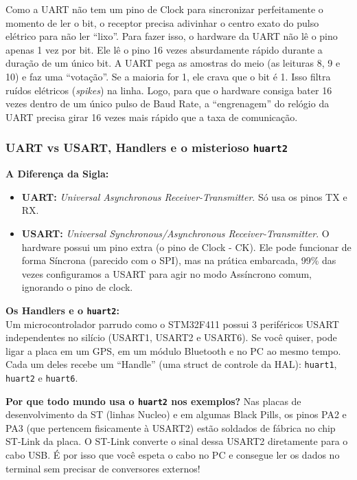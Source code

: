 \documentclass[12pt,a4paper]{article}
\begin{document}
Como a UART não tem um pino de Clock para sincronizar perfeitamente o momento de ler o bit, o receptor precisa adivinhar o centro exato do pulso elétrico para não ler ``lixo''.
Para fazer isso, o hardware da UART não lê o pino apenas 1 vez por bit. Ele lê o pino 16 vezes absurdamente rápido durante a duração de um único bit.
A UART pega as amostras do meio (as leituras 8, 9 e 10) e faz uma ``votação''. Se a maioria for 1, ele crava que o bit é 1. Isso filtra ruídos elétricos (\textit{spikes}) na linha.
Logo, para que o hardware consiga bater 16 vezes dentro de um único pulso de Baud Rate, a ``engrenagem'' do relógio da UART precisa girar 16 vezes mais rápido que a taxa de comunicação.

\subsubsection{UART vs USART, Handlers e o misterioso \texttt{huart2}}
\textbf{A Diferença da Sigla:}
\begin{itemize}
    \item \textbf{UART:} \textit{Universal Asynchronous Receiver-Transmitter}. Só usa os pinos TX e RX.
    \item \textbf{USART:} \textit{Universal Synchronous/Asynchronous Receiver-Transmitter}. O hardware possui um pino extra (o pino de Clock - CK). Ele pode funcionar de forma Síncrona (parecido com o SPI), mas na prática embarcada, 99\% das vezes configuramos a USART para agir no modo Assíncrono comum, ignorando o pino de clock.
\end{itemize}

\textbf{Os Handlers e o \texttt{huart2}:}\\
Um microcontrolador parrudo como o STM32F411 possui 3 periféricos USART independentes no silício (USART1, USART2 e USART6). Se você quiser, pode ligar a placa em um GPS, em um módulo Bluetooth e no PC ao mesmo tempo.
Cada um deles recebe um ``Handle'' (uma struct de controle da HAL): \texttt{huart1}, \texttt{huart2} e \texttt{huart6}.

\textbf{Por que todo mundo usa o \texttt{huart2} nos exemplos?} Nas placas de desenvolvimento da ST (linhas Nucleo) e em algumas Black Pills, os pinos PA2 e PA3 (que pertencem fisicamente à USART2) estão soldados de fábrica no chip ST-Link da placa. O ST-Link converte o sinal dessa USART2 diretamente para o cabo USB. É por isso que você espeta o cabo no PC e consegue ler os dados no terminal sem precisar de conversores externos!
\end{document}
